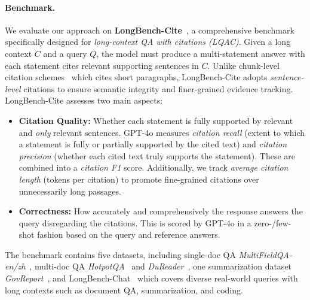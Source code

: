 \paragraph{Benchmark.}
We evaluate our approach on \textbf{LongBench-Cite}~\citep{zhang2024longcite}, a comprehensive benchmark specifically designed for \emph{long-context QA with citations (LQAC)}. Given a long context $C$ and a query $Q$, the model must produce a multi-statement answer with each statement cites relevant supporting sentences in $C$. 
Unlike chunk-level citation schemes~\citep{gao2023enabling} which cites short paragraphs, LongBench-Cite adopts \emph{sentence-level} citations to ensure semantic integrity and finer-grained evidence tracking.
LongBench-Cite assesses two main aspects:
\begin{itemize}
\item \textbf{Citation Quality:} Whether each statement is fully supported by relevant and \emph{only} relevant sentences. GPT-4o measures \emph{citation recall} (extent to which a statement is fully or partially supported by the cited text) and \emph{citation precision} (whether each cited text truly supports the statement). These are combined into a \emph{citation F1} score. Additionally, we track \emph{average citation length} (tokens per citation) to promote fine-grained citations over unnecessarily long passages.
\item \textbf{Correctness:} How accurately and comprehensively the response answers the query disregarding the citations. This is scored by GPT-4o in a zero-/few-shot fashion based on the query and reference answers.
\end{itemize}

The benchmark contains five datasets, including single-doc QA \textit{MultiFieldQA-en/zh}~\citep{bai2023longbench}, multi-doc QA \textit{HotpotQA}~\citep{yang2018hotpotqa} and \textit{DuReader}~\citep{he2018dureader}, one summarization dataset \textit{GovReport}~\citep{huang2021efficient}, and LongBench-Chat~\citep{bai2024longalign} which covers diverse real-world queries with long contexts such as document QA, summarization, and coding.

